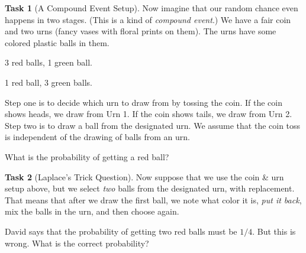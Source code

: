 \documentclass[12pt]{amsart}
\theoremstyle{definition}
\newtheorem{task}{Task}
\begin{document}
\begin{task}[A Compound Event Setup] Now imagine that our random chance even happens in two stages. (This is a kind of \emph{compound event}.) We have a fair coin and two urns (fancy vases with floral prints on them). The urns have some colored plastic balls in them.
\begin{compactdesc}
\item[Urn 1] 3 red balls, 1 green ball.
\item[Urn 2] 1 red ball, 3 green balls.
\end{compactdesc}
Step one is to decide which urn to draw from by tossing the coin. If the coin shows heads, we draw from Urn 1. If the coin shows tails, we draw from Urn 2. Step two is to draw a ball from the designated urn. We assume that the coin toss is independent of the drawing of balls from an urn.

What is the probability of getting a red ball?
\end{task}


\begin{task}[Laplace's Trick Question]
Now suppose that we use the coin \& urn setup above, but we select \emph{two} balls from the designated urn, with replacement. That means that after we draw the first ball, we note what color it is, \emph{put it back}, mix the balls in the urn, and then choose again.

David says that the probability of getting two red balls must be $1/4$. But this is wrong. What is the correct probability?
\end{task}
\end{document}
